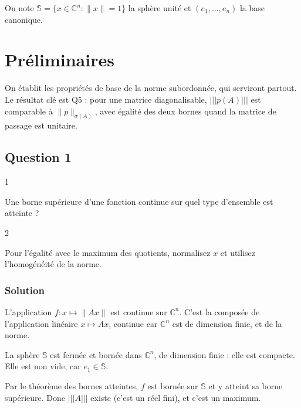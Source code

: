 \documentclass[11pt,a4paper]{article}
\begin{document}
On note \(\mathbb S=\{x\in\mathbb C^n:\|x\|=1\}\) la sphère unité et \((e_1,\dots,e_n)\) la base canonique.

\hypertarget{pruxe9liminaires}{%
\section{Préliminaires}\label{pruxe9liminaires}}

On établit les propriétés de base de la norme subordonnée, qui serviront partout. Le résultat clé est Q5 : pour une matrice diagonalisable, \(\vert\!\vert\!\vert p(A)\vert\!\vert\!\vert\) est comparable à \(\|p\|_{\sigma(A)}\), avec égalité des deux bornes quand la matrice de passage est unitaire.

\hypertarget{question-1}{%
\subsection{Question 1}\label{question-1}}

\begin{indication}{1}

Une borne supérieure d'une fonction continue sur quel type d'ensemble est atteinte ?

\end{indication}

\begin{indication}{2}

Pour l'égalité avec le maximum des quotients, normalisez \(x\) et utilisez l'homogénéité de la norme.

\end{indication}

\hypertarget{solution}{%
\subsubsection{Solution}\label{solution}}

L'application \(f:x\mapsto\|Ax\|\) est continue sur \(\mathbb C^n\). C'est la composée de l'application linéaire \(x\mapsto Ax\), continue car \(\mathbb C^n\) est de dimension finie, et de la norme.

La sphère \(\mathbb S\) est fermée et bornée dans \(\mathbb C^n\), de dimension finie : elle est compacte. Elle est non vide, car \(e_1\in\mathbb S\).

Par le théorème des bornes atteintes, \(f\) est bornée sur \(\mathbb S\) et y atteint sa borne supérieure. Donc \(\vert\!\vert\!\vert A\vert\!\vert\!\vert\) existe (c'est un réel fini), et c'est un maximum.
\end{document}
